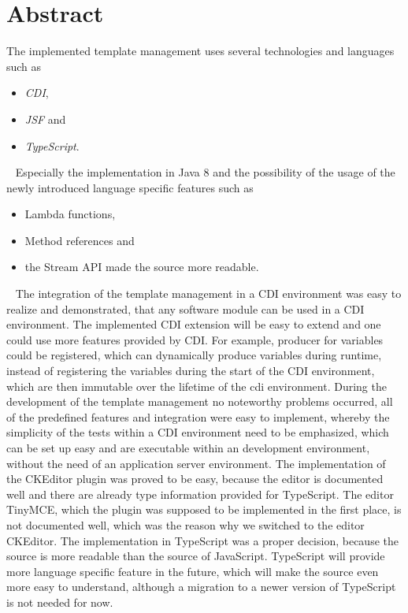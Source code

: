 \chapter{Abstract}
The implemented template management uses several technologies and languages such as 
\begin{itemize}
	\item\emph{CDI},
	\item\emph{JSF} and 
	\item\emph{TypeScript}.
\end{itemize}
\ \newline
Especially the implementation in Java 8 and the possibility of the usage of the newly introduced language specific features such as
\begin{itemize}
	\item Lambda functions,
	\item Method references and
	\item the Stream API made the source more readable.
\end{itemize}
\ \newline
The integration of the template management in a CDI environment was easy to realize and demonstrated, that any software module can be used in a CDI environment. The implemented CDI extension will be easy to extend and one could use more features provided by CDI. For example, producer for variables could be registered, which can dynamically produce variables during runtime, instead of registering the variables during the start of the CDI environment, which are then immutable over the lifetime of the cdi environment.
\newline
\newline
During the development of the template management no noteworthy problems occurred, all of the predefined features and integration were easy to implement, whereby the simplicity of the tests within a CDI environment need to be emphasized, which can be set up easy and are executable within an development environment, without the need of an application server environment.
\newline
\newline
The implementation of the CKEditor plugin was proved to be easy, because the editor is documented well and there are already type information provided for TypeScript. The editor TinyMCE, which the plugin was supposed to be implemented in the first place, is not documented well, which was the reason why we switched to the editor CKEditor. The implementation in TypeScript was a proper decision, because the source is more readable than the source of JavaScript. TypeScript will provide more language specific feature in the future, which will make the source even more easy to understand, although a migration to a newer version of TypeScript is not needed for now.
